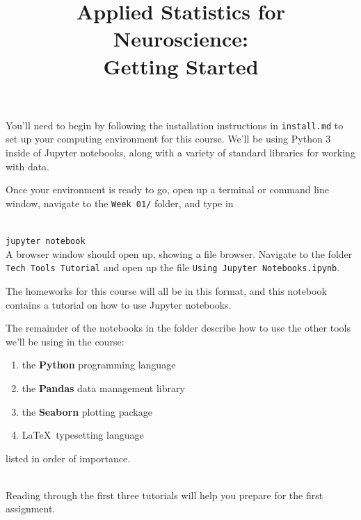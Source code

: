 \documentclass[twoside]{article}
\title{Applied Statistics for Neuroscience:\\
	Getting Started}
\begin{document}
\maketitle

You'll need to begin by following the installation instructions in
\texttt{install.md}
to set up your computing environment for this course.
We'll be using Python 3 inside of Jupyter notebooks,
along with a variety of standard libraries for working with data.

Once your environment is ready to go,
open up a terminal or command line window,
navigate to the \texttt{Week 01/} folder,
and type in

\ \\
\texttt{jupyter notebook}
\ \\

A browser window should open up, showing a file browser.
Navigate to the folder \texttt{Tech Tools Tutorial}
and open up the file
\texttt{Using Jupyter Notebooks.ipynb}.

The homeworks for this course will all be in this format,
and this notebook contains a tutorial on how to use Jupyter notebooks.

The remainder of the notebooks in the folder describe how
to use the other tools we'll be using in the course:

\begin{enumerate}
\item the \textbf{Python} programming language
\item the \textbf{Pandas} data management library
\item the \textbf{Seaborn} plotting package
\item \LaTeX \ typesetting language
\end{enumerate}

listed in order of importance.

\ \\

Reading through the first three tutorials will help you
prepare for the first assignment.
\end{document}
